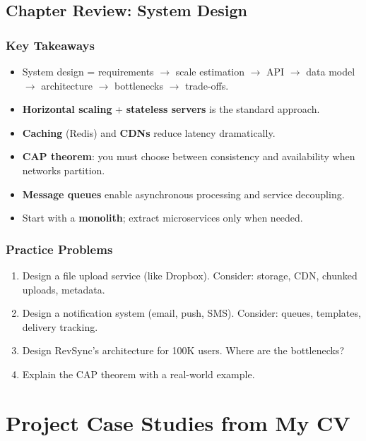 \documentclass[12pt, a4paper, oneside]{book}
\begin{document}
\section{Chapter Review: System Design}

\subsection{Key Takeaways}
\begin{itemize}[leftmargin=2em]
    \item System design = requirements $\to$ scale estimation $\to$ API $\to$ data model $\to$ architecture $\to$ bottlenecks $\to$ trade-offs.
    \item \textbf{Horizontal scaling} + \textbf{stateless servers} is the standard approach.
    \item \textbf{Caching} (Redis) and \textbf{CDNs} reduce latency dramatically.
    \item \textbf{CAP theorem}: you must choose between consistency and availability when networks partition.
    \item \textbf{Message queues} enable asynchronous processing and service decoupling.
    \item Start with a \textbf{monolith}; extract microservices only when needed.
\end{itemize}

\subsection{Practice Problems}
\begin{enumerate}[leftmargin=2em]
    \item Design a file upload service (like Dropbox). Consider: storage, CDN, chunked uploads, metadata.
    \item Design a notification system (email, push, SMS). Consider: queues, templates, delivery tracking.
    \item Design RevSync's architecture for 100K users. Where are the bottlenecks?
    \item Explain the CAP theorem with a real-world example.
\end{enumerate}




\chapter{Project Case Studies from My CV}
\end{document}
